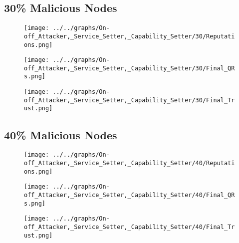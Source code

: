 \begin{minipage}[t]{0.49\columnwidth}
\subsection*{30\% Malicious Nodes}
    \begin{figure}[H]
        \centering
        \texttt{[image: ../../graphs/On-off\_Attacker,\_Service\_Setter,\_Capability\_Setter/30/Reputations.png]}
    \end{figure}
    \begin{figure}[H]
        \centering
        \texttt{[image: ../../graphs/On-off\_Attacker,\_Service\_Setter,\_Capability\_Setter/30/Final\_QRs.png]}
    \end{figure}
\end{minipage}
\begin{minipage}[t]{0.49\columnwidth}
    \begin{figure}[H]
        \centering
        \texttt{[image: ../../graphs/On-off\_Attacker,\_Service\_Setter,\_Capability\_Setter/30/Final\_Trust.png]}
    \end{figure}
\end{minipage}

\begin{minipage}[t]{0.49\columnwidth}
\subsection*{40\% Malicious Nodes}
    \begin{figure}[H]
        \centering
        \texttt{[image: ../../graphs/On-off\_Attacker,\_Service\_Setter,\_Capability\_Setter/40/Reputations.png]}
    \end{figure}
    \begin{figure}[H]
        \centering
        \texttt{[image: ../../graphs/On-off\_Attacker,\_Service\_Setter,\_Capability\_Setter/40/Final\_QRs.png]}
    \end{figure}
\end{minipage}
\begin{minipage}[t]{0.49\columnwidth}
    \begin{figure}[H]
        \centering
        \texttt{[image: ../../graphs/On-off\_Attacker,\_Service\_Setter,\_Capability\_Setter/40/Final\_Trust.png]}
    \end{figure}
\end{minipage}

